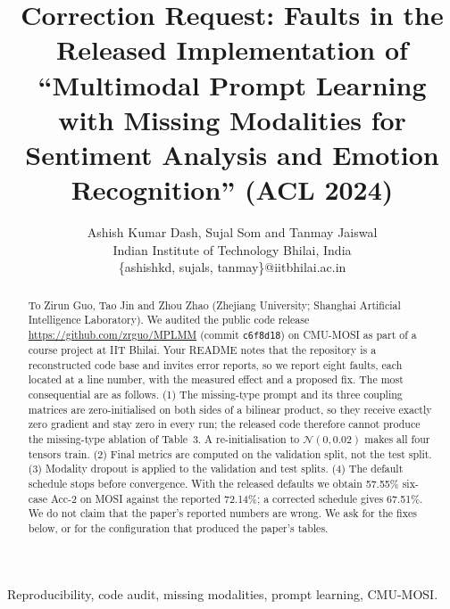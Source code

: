 \documentclass[lettersize,journal]{IEEEtran}
\begin{document}
\title{Correction Request: Faults in the Released Implementation of ``Multimodal Prompt Learning with Missing Modalities for Sentiment Analysis and Emotion Recognition'' (ACL 2024)}

\author{Ashish Kumar Dash, Sujal Som and Tanmay Jaiswal\\
Indian Institute of Technology Bhilai, India\\
\{ashishkd, sujals, tanmay\}@iitbhilai.ac.in}

\maketitle

\begin{abstract}
To Zirun Guo, Tao Jin and Zhou Zhao (Zhejiang University; Shanghai Artificial Intelligence Laboratory). We audited the public code release \url{https://github.com/zrguo/MPLMM} (commit \texttt{c6f8d18}) on CMU-MOSI as part of a course project at IIT Bhilai. Your README notes that the repository is a reconstructed code base and invites error reports, so we report eight faults, each located at a line number, with the measured effect and a proposed fix. The most consequential are as follows. (1) The missing-type prompt and its three coupling matrices are zero-initialised on both sides of a bilinear product, so they receive exactly zero gradient and stay zero in every run; the released code therefore cannot produce the missing-type ablation of Table~3. A re-initialisation to $\mathcal{N}(0,0.02)$ makes all four tensors train. (2) Final metrics are computed on the validation split, not the test split. (3) Modality dropout is applied to the validation and test splits. (4) The default schedule stops before convergence. With the released defaults we obtain 57.55\% six-case Acc-2 on MOSI against the reported 72.14\%; a corrected schedule gives 67.51\%. We do not claim that the paper's reported numbers are wrong. We ask for the fixes below, or for the configuration that produced the paper's tables.
\end{abstract}

\begin{IEEEkeywords}
Reproducibility, code audit, missing modalities, prompt learning, CMU-MOSI.
\end{IEEEkeywords}
\end{document}
